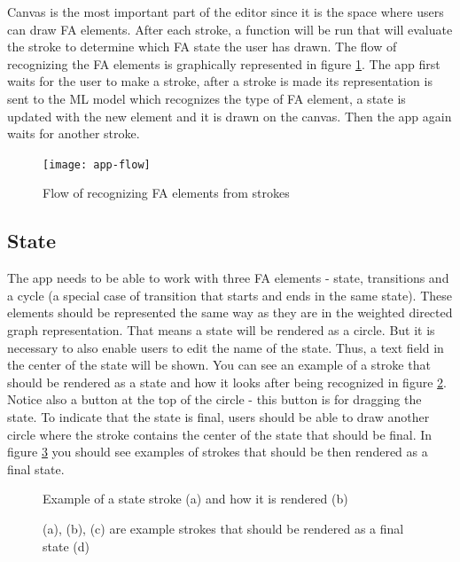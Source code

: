 Canvas is the most important part of the editor since it is the space where users can draw FA elements. After each stroke, a function will be run that will evaluate the stroke to determine which FA state the user has drawn. The flow of recognizing the FA elements is graphically represented in figure \ref{app-flow}. The app first waits for the user to make a stroke, after a stroke is made its representation is sent to the ML model which recognizes the type of FA element, a state is updated with the new element and it is drawn on the canvas. Then the app again waits for another stroke.

\begin{figure}
    \texttt{[image: app-flow]}
    \caption{Flow of recognizing FA elements from strokes}\label{app-flow}
\end{figure}

\subsection{State}

The app needs to be able to work with three FA elements - state, transitions and a cycle (a special case of transition that starts and ends in the same state). These elements should be represented the same way as they are in the weighted directed graph representation. That means a state will be rendered as a circle. But it is necessary to also enable users to edit the name of the state. Thus, a text field in the center of the state will be shown. You can see an example of a stroke that should be rendered as a state and how it looks after being recognized in figure \ref{state}. Notice also a button at the top of the circle - this button is for dragging the state. To indicate that the state is final, users should be able to draw another circle where the stroke contains the center of the state that should be final. In figure \ref{final-state} you should see examples of strokes that should be then rendered as a final state.

\begin{figure}
    \centering
    \caption{Example of a state stroke (a) and how it is rendered (b)}\label{state}
\end{figure}

\begin{figure}
    \centering
    \caption{(a), (b), (c) are example strokes that should be rendered as a final state (d)}\label{final-state}
\end{figure}

